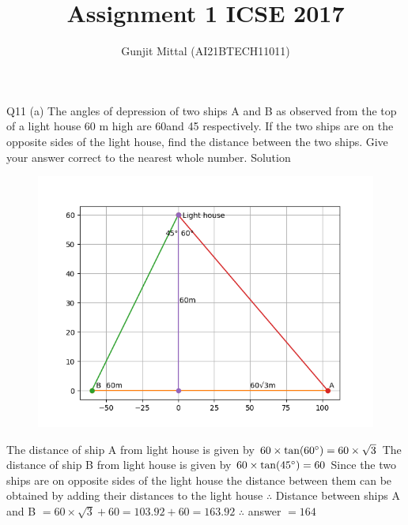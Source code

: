 \documentclass[12pt,twocolumn]{article}
\begin{document}
\title{Assignment 1 ICSE 2017}
\author{Gunjit Mittal (AI21BTECH11011)}
\maketitle
Q11 (a)
The angles of depression of two ships A and B as observed from the top of a light 
house 60 m high are 60\degree and 45\degree
respectively. If the two ships are on the opposite 
sides of the light house, find the distance between the two ships. Give your answer 
correct to the nearest whole number.
{Solution}
\begin{figure}[h]
    \centering 
    \includegraphics[scale=0.6]{./figs/11.a.png}
\end{figure}
\par 
The distance of ship A from light house is given by $60 \times \tan(60\degree) = 60 \times \sqrt{3} $
\newline
The distance of ship B from light house is given by $60 \times \tan(45\degree) = 60 $
\newline
Since the two ships are on opposite sides of the light house the distance between them can be obtained by adding their distances to the light house 
\newline
$\therefore$ Distance between ships A and B $= 60 \times \sqrt3 + 60 = 103.92 + 60 = 163.92$
\newline 
$\therefore$ answer $= 164 $
\end{document}
